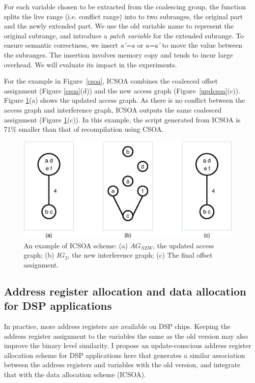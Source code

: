 For each variable chosen to be extracted from the coalescing group, the function splits the live range (i.e. conflict 
range) into to two subranges, the original part and the newly extended part. We use the old variable name to represent 
the original subrange, and introduce a {\em patch variable} for the extended subrange. To ensure semantic correctness, 
we insert {\it a'=a} or {\it a=a'} to move the value between the subranges. The insertion involves memory copy and 
tends to incur large overhead. We will evaluate its impact in the experiments.
 
For the example in Figure~\ref{csoa}, ICSOA combines the coalesced offset assignment (Figure \ref{csoa}(d)) and the new 
access graph (Figure~\ref{updcsoa}(c)). Figure \ref{icsoa}(a) shows the updated access graph. As there is no conflict 
between the access graph and interference graph, ICSOA outputs the same coalesced assignment (Figure \ref{icsoa}(c)). 
In this example, the script generated from ICSOA is 71\% smaller than that of recompilation using CSOA.

\begin{figure}[htbp]
\begin{center}
\includegraphics[scale=0.5]{./figures/icsoa.eps}
\caption[An example of ICSOA scheme.]{An example of ICSOA scheme:
(a) $\textit{AG}_\textit{NEW}$, the updated access graph;
(b) $\textit{IG}_2$, the new interference graph;
(c) The final offset assignment.}
\label{icsoa}
\end{center}
\vspace{-0.15in}
\end{figure}

\subsection{Address register allocation and data allocation for DSP applications}
In practice, more address registers are available on DSP chips. Keeping the address register assignment to the 
variables the same as the old version may also improve the binary level similarity.
I propose an update-conscious address register allocation scheme for DSP applications here that generates a similar 
association between the address registers and variables
with the old version, and integrate that with the data allocation scheme (ICSOA).

